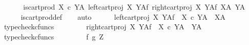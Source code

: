 \begin{isabellebody}
%
\endisadelimproof
%
\isatagproof
{}\isamarkupfalse%
\ {\isacharminus}{\kern0pt}\ \isanewline
\ \ \isamarkupfalse%
\ {\isachardoublequoteopen}is{\isacharunderscore}{\kern0pt}cart{\isacharunderscore}{\kern0pt}prod\ {\isacharparenleft}{\kern0pt}{\isacharparenleft}{\kern0pt}X\ {\isasymtimes}\isactrlsub c\ Y{\isacharparenright}{\kern0pt}\isactrlbsup A\isactrlesup {\isacharparenright}{\kern0pt}\ {\isacharparenleft}{\kern0pt}{\isacharparenleft}{\kern0pt}left{\isacharunderscore}{\kern0pt}cart{\isacharunderscore}{\kern0pt}proj\ X\ Y{\isacharparenright}{\kern0pt}\isactrlbsup A\isactrlesup \isactrlsub f{\isacharparenright}{\kern0pt}\ {\isacharparenleft}{\kern0pt}right{\isacharunderscore}{\kern0pt}cart{\isacharunderscore}{\kern0pt}proj\ X\ Y\isactrlbsup A\isactrlesup \isactrlsub f{\isacharparenright}{\kern0pt}\ {\isacharparenleft}{\kern0pt}X\isactrlbsup A\isactrlesup {\isacharparenright}{\kern0pt}\ {\isacharparenleft}{\kern0pt}Y\isactrlbsup A\isactrlesup {\isacharparenright}{\kern0pt}{\isachardoublequoteclose}\isanewline
\ \ \ \ \isamarkupfalse%
\ is{\isacharunderscore}{\kern0pt}cart{\isacharunderscore}{\kern0pt}prod{\isacharunderscore}{\kern0pt}def\isanewline
\ \ \isamarkupfalse%
\ auto\isanewline
\ \ \ \ \isamarkupfalse%
\ {\isachardoublequoteopen}{\isacharparenleft}{\kern0pt}left{\isacharunderscore}{\kern0pt}cart{\isacharunderscore}{\kern0pt}proj\ X\ Y{\isacharparenright}{\kern0pt}\isactrlbsup A\isactrlesup \isactrlsub f\ {\isacharcolon}{\kern0pt}\ {\isacharparenleft}{\kern0pt}X\ {\isasymtimes}\isactrlsub c\ Y{\isacharparenright}{\kern0pt}\isactrlbsup A\isactrlesup \ {\isasymrightarrow}\ X\isactrlbsup A\isactrlesup {\isachardoublequoteclose}\isanewline
\ \ \ \ \ \ \isamarkupfalse%
\ typecheck{\isacharunderscore}{\kern0pt}cfuncs\isanewline
\ \ \isamarkupfalse%
\isanewline
\ \ \ \ \isamarkupfalse%
\ {\isachardoublequoteopen}{\isacharparenleft}{\kern0pt}right{\isacharunderscore}{\kern0pt}cart{\isacharunderscore}{\kern0pt}proj\ X\ Y{\isacharparenright}{\kern0pt}\isactrlbsup A\isactrlesup \isactrlsub f\ {\isacharcolon}{\kern0pt}\ {\isacharparenleft}{\kern0pt}X\ {\isasymtimes}\isactrlsub c\ Y{\isacharparenright}{\kern0pt}\isactrlbsup A\isactrlesup \ {\isasymrightarrow}\ Y\isactrlbsup A\isactrlesup {\isachardoublequoteclose}\isanewline
\ \ \ \ \ \ \isamarkupfalse%
\ typecheck{\isacharunderscore}{\kern0pt}cfuncs\isanewline
\ \ \isamarkupfalse%
\isanewline
\ \ \ \ \isamarkupfalse%
\ f\ g\ Z\ \isanewline

\end{isabellebody}
